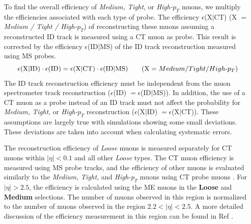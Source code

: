 To find the overall efficiency of \textit{Medium, Tight,} or \textit{High-$p_T$} muons, we multiply the efficiencies associated with each type of probe. The efficiency  $\epsilon$(X$|$CT) (X $=$ \textit{Medium / Tight / High-$p_T$}) of reconstructing these muons assuming a reconstructed ID track is measured using a CT muon as probe. This result is corrected by the efficiency $\epsilon$(ID$|$MS) of the ID track reconstruction measured using MS probes.
\begin{equation}
\epsilon \textrm{(X$|$ID)} \cdot \epsilon \textrm{(ID)} = \epsilon \textrm{(X$|$CT)} \cdot \epsilon \textrm{(ID$|$MS)} \hspace{20 pt} (\textrm{X} = Medium/Tight/High\textrm{-}p_T)
\end{equation}
The ID track reconstruction efficiency must be independent from the muon spectrometer track reconstruction ($\epsilon$(ID) $= \epsilon$(ID$|$MS)). In addition, the use of a CT muon as a probe instead of an ID track must not affect the probability for \textit{Medium, Tight,} or \textit{High-$p_T$} reconstruction ($\epsilon$(X$|$ID) $= \epsilon$(X$|$CT)). These assumptions are largely true with simulations showing some small deviations. These deviations are taken into account when calculating systematic errors. 

The reconstruction efficiency of \textit{Loose} muons is measured separately for CT muons within $|\eta| < 0.1$ and all other \textit{Loose} types. The CT muon efficiency is measured using MS probe tracks, and the efficiency of other muons is evaluated similarly to the \textit{Medium, Tight,} and \textit{High-$p_T$} muons using CT probe muons \cite{MCPpaper}. For $|\eta| > 2.5$, the efficiency is calculated using the ME muons in the \textbf{Loose} and \textbf{Medium} selections. The number of muons observed in this region is normalized to the number of muons observed in the region $2.2 < |\eta| < 2.5$. A more detailed discussion of the efficiency measurement in this region can be found in Ref \cite{oldMCPpaper}. 

